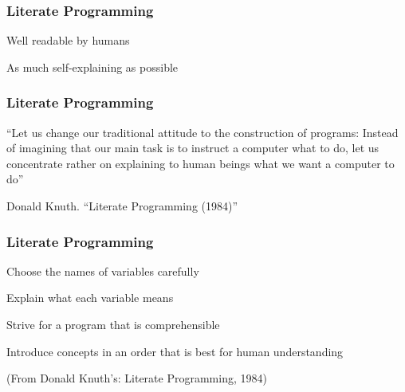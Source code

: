 \documentclass[12pt]{beamer}\usepackage[]{graphicx}\usepackage[]{color}
\begin{document}
\begin{frame}[fragile]
\frametitle{Literate Programming}

\bbi
  \item Well readable by humans
  \item As much self-explaining as possible
\ei
\eb

\end{frame}


\begin{frame}
\frametitle{Literate Programming}

{\large ``Let us change our traditional attitude to the construction of programs: Instead of imagining that our main task is to instruct a computer what to do, let us concentrate rather on explaining to human beings what we want a computer to do''}

\bigskip
Donald Knuth. ``Literate Programming (1984)''

\end{frame}


\begin{frame}[fragile]
\frametitle{Literate Programming}

\bbi
  \item Choose the names of variables carefully
  \item Explain what each variable means
  \item Strive for a program that is comprehensible
  \item Introduce concepts in an order that is best for human understanding
\ei

\bigskip
{\footnotesize (From Donald Knuth's: Literate Programming, 1984)}

\end{frame}

\end{document}
